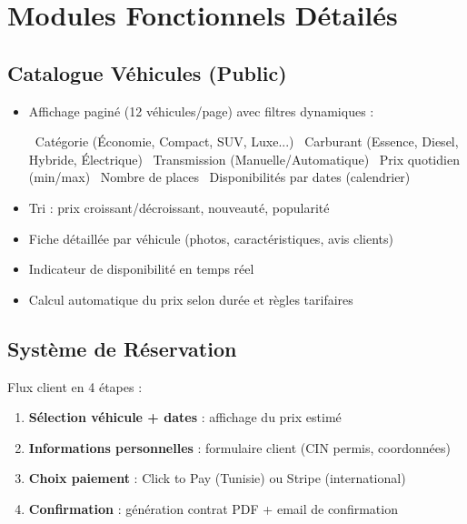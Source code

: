 \documentclass[12pt, a4paper]{article}
\begin{document}
\section{Modules Fonctionnels Détailés}

\subsection{Catalogue Véhicules (Public)}

\begin{itemize}[leftmargin=*,noitemsep]
  \item Affichage paginé (12 véhicules/page) avec filtres dynamiques :
    \begin{itemize}[leftmargin=*,noitemsep]
      \ Catégorie (Économie, Compact, SUV, Luxe...)
      \ Carburant (Essence, Diesel, Hybride, Électrique)
      \ Transmission (Manuelle/Automatique)
      \ Prix quotidien (min/max)
      \ Nombre de places
      \ Disponibilités par dates (calendrier)
    \end{itemize}
  \item Tri : prix croissant/décroissant, nouveauté, popularité
  \item Fiche détaillée par véhicule (photos, caractéristiques, avis clients)
  \item Indicateur de disponibilité en temps réel
  \item Calcul automatique du prix selon durée et règles tarifaires
\end{itemize}

\subsection{Système de Réservation}

Flux client en 4 étapes :
\begin{enumerate}[leftmargin=*,noitemsep]
  \item \textbf{Sélection véhicule + dates} : affichage du prix estimé
  \item \textbf{Informations personnelles} : formulaire client (CIN permis, coordonnées)
  \item \textbf{Choix paiement} : Click to Pay (Tunisie) ou Stripe (international)
  \item \textbf{Confirmation} : génération contrat PDF + email de confirmation
\end{enumerate}
\end{document}
